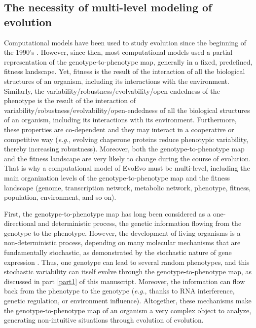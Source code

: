 
\subsection{The necessity of multi-level modeling of evolution}
Computational models have been used to study evolution since the beginning of the 1990's \citep{adami-2006}. However, since then, most computational models used a partial representation of the genotype-to-phenotype map, generally in a fixed, predefined, fitness landscape. Yet, fitness is the result of the interaction of all the biological structures of an organism, including its interactions with the environment. Similarly, the variability/robustness/evolvability/open-endedness of the phenotype is the result of the interaction of variability/robustness/evolvability/open-endedness of all the biological structures of an organism, including its interactions with its environment. Furthermore, these properties are co-dependent and they may interact in a cooperative or competitive way (\textit{e.g.}, evolving chaperone proteins reduce phenotypic variability, thereby increasing robustness). Moreover, both the genotype-to-phenotype map and the fitness landscape are very likely to change during the course of evolution. That is why a computational model of EvoEvo must be multi-level, including the main organization levels of the genotype-to-phenotype map and the fitness landscape (genome, transcription network, metabolic network, phenotype, fitness, population, environment, and so on).

First, the genotype-to-phenotype map has long been considered as a one-directional and deterministic process, the genetic information flowing from the genotype to the phenotype. However, the development of living organisms is a non-deterministic process, depending on many molecular mechanisms that are fundamentally stochastic, as demonstrated by the stochastic nature of gene expression \citep{elowitz-et-al-2002}. Thus, one genotype can lead to several random phenotypes, and this stochastic variability can itself evolve through the genotype-to-phenotype map, as discussed in part \ref{part1} of this manuscript. Moreover, the information can flow back from the phenotype to the genotype (\textit{e.g.}, thanks to RNA interference, genetic regulation, or environment influence). Altogether, these mechanisms make the genotype-to-phenotype map of an organism a very complex object to analyze, generating non-intuitive situations through evolution of evolution.

